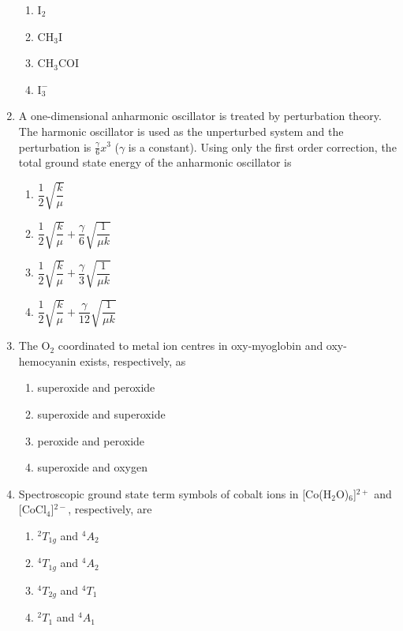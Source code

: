\documentclass{article}
\begin{document}
\begin{enumerate}
\begin{multicols}{4}
    \begin{enumerate}
        \item $\text{I}_2$
        \item $\text{CH}_3\text{I}$
        \item $\text{CH}_3\text{COI}$
        \item $\text{I}_3^-$
    \end{enumerate}
\end{multicols}

\item A one-dimensional anharmonic oscillator is treated by perturbation theory. The harmonic 
oscillator is used as the unperturbed system and the perturbation is $\frac{\gamma}{6}x^3$ 
($\gamma$ is a constant). Using only the first order correction, the total ground state energy 
of the anharmonic oscillator is

\begin{multicols}{2}
\begin{enumerate}
    \item $\dfrac{1}{2}\sqrt{\dfrac{k}{\mu}}$
    \item $\dfrac{1}{2}\sqrt{\dfrac{k}{\mu}} + \dfrac{\gamma}{6}\sqrt{\dfrac{1}{\mu k}}$
    \item $\dfrac{1}{2}\sqrt{\dfrac{k}{\mu}} + \dfrac{\gamma}{3}\sqrt{\dfrac{1}{\mu k}}$
    \item $\dfrac{1}{2}\sqrt{\dfrac{k}{\mu}} + \dfrac{\gamma}{12}\sqrt{\dfrac{1}{\mu k}}$
\end{enumerate}
\end{multicols}

\item The O$_2$ coordinated to metal ion centres in oxy-myoglobin and oxy-hemocyanin exists, 
respectively, as
\begin{multicols}{2}
\begin{enumerate}
    \item superoxide and peroxide
    \item superoxide and superoxide
    \item peroxide and peroxide
    \item superoxide and oxygen
\end{enumerate}
\end{multicols}

\item Spectroscopic ground state term symbols of cobalt ions in [Co(H$_2$O)$_6$]$^{2+}$ and [CoCl$_4$]$^{2-}$, 
respectively, are
\begin{multicols}{2}
\begin{enumerate}
    \item $^2T_{1g}$ and $^4A_2$
    \item $^4T_{1g}$ and $^4A_2$
    \item $^4T_{2g}$ and $^4T_1$
    \item $^2T_1$ and $^4A_1$
\end{enumerate}
\end{multicols}


\end{enumerate}
\end{document}
